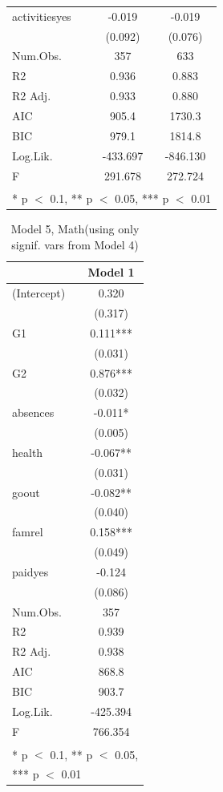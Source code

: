 \documentclass[12pt,english]{article}
\begin{document}
\begin{table}
\begin{tabular}[t]{lcc}
activitiesyes & -0.019 & -0.019\\
 & (0.092) & (0.076)\\
\midrule
Num.Obs. & 357 & 633\\
R2 & 0.936 & 0.883\\
R2 Adj. & 0.933 & 0.880\\
AIC & 905.4 & 1730.3\\
BIC & 979.1 & 1814.8\\
Log.Lik. & -433.697 & -846.130\\
F & 291.678 & 272.724\\
\bottomrule
\multicolumn{3}{l}{\textsuperscript{} * p $<$ 0.1, ** p $<$ 0.05, *** p $<$ 0.01}\\
\end{tabular}
\end{table}
\begin{table}
\caption{Model 5, Math(using only signif. vars from Model 4)}
\label{tab:model5m}
\centering
\begin{tabular}[t]{lc}
\toprule
  & Model 1\\
\midrule
(Intercept) & 0.320\\
 & (0.317)\\
G1 & 0.111***\\
 & \vphantom{1} (0.031)\\
G2 & 0.876***\\
 & (0.032)\\
absences & -0.011*\\
 & (0.005)\\
health & -0.067**\\
 & (0.031)\\
goout & -0.082**\\
 & (0.040)\\
famrel & 0.158***\\
 & (0.049)\\
paidyes & -0.124\\
 & (0.086)\\
\midrule
Num.Obs. & 357\\
R2 & 0.939\\
R2 Adj. & 0.938\\
AIC & 868.8\\
BIC & 903.7\\
Log.Lik. & -425.394\\
F & 766.354\\
\bottomrule
\multicolumn{2}{l}{\textsuperscript{} * p $<$ 0.1, ** p $<$ 0.05,}\\
\multicolumn{2}{l}{*** p $<$ 0.01}\\
\end{tabular}
\end{table}
\end{document}
